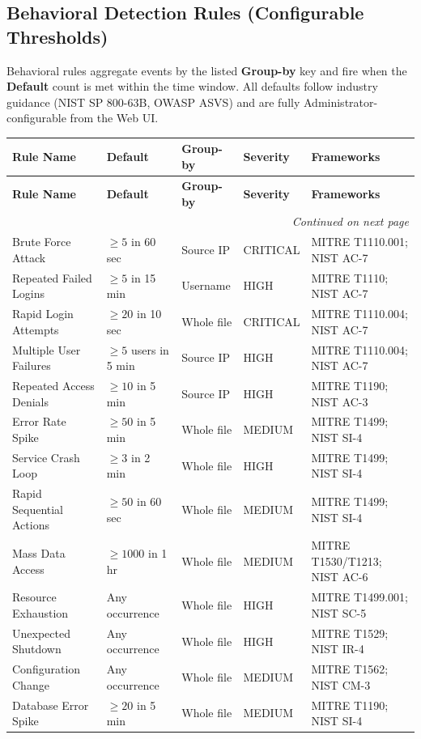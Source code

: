 \documentclass[12pt,a4paper]{article}
\begin{document}
\subsection{Behavioral Detection Rules (Configurable Thresholds)}

Behavioral rules aggregate events by the listed \textbf{Group-by} key and fire when the
\textbf{Default} count is met within the time window. All defaults follow industry guidance
(NIST SP 800-63B, OWASP ASVS) and are fully Administrator-configurable from the Web UI.

\begin{longtable}{|p{3.7cm}|p{3.0cm}|p{2.1cm}|p{1.9cm}|p{3.0cm}|}
\hline
\textbf{Rule Name} & \textbf{Default} & \textbf{Group-by} & \textbf{Severity} & \textbf{Frameworks} \\
\hline
\endfirsthead
\hline
\textbf{Rule Name} & \textbf{Default} & \textbf{Group-by} & \textbf{Severity} & \textbf{Frameworks} \\
\hline
\endhead
\hline
\multicolumn{5}{|r|}{\textit{Continued on next page}} \\
\hline
\endfoot
\hline
\endlastfoot
Brute Force Attack & $\geq 5$ in 60 sec & Source IP & CRITICAL & MITRE T1110.001; NIST AC-7 \\
\hline
Repeated Failed Logins & $\geq 5$ in 15 min & Username & HIGH & MITRE T1110; NIST AC-7 \\
\hline
Rapid Login Attempts & $\geq 20$ in 10 sec & Whole file & CRITICAL & MITRE T1110.004; NIST AC-7 \\
\hline
Multiple User Failures & $\geq 5$ users in 5 min & Source IP & HIGH & MITRE T1110.004; NIST AC-7 \\
\hline
Repeated Access Denials & $\geq 10$ in 5 min & Source IP & HIGH & MITRE T1190; NIST AC-3 \\
\hline
Error Rate Spike & $\geq 50$ in 5 min & Whole file & MEDIUM & MITRE T1499; NIST SI-4 \\
\hline
Service Crash Loop & $\geq 3$ in 2 min & Whole file & HIGH & MITRE T1499; NIST SI-4 \\
\hline
Rapid Sequential Actions & $\geq 50$ in 60 sec & Whole file & MEDIUM & MITRE T1499; NIST SI-4 \\
\hline
Mass Data Access & $\geq 1000$ in 1 hr & Whole file & MEDIUM & MITRE T1530/T1213; NIST AC-6 \\
\hline
Resource Exhaustion & Any occurrence & Whole file & HIGH & MITRE T1499.001; NIST SC-5 \\
\hline
Unexpected Shutdown & Any occurrence & Whole file & HIGH & MITRE T1529; NIST IR-4 \\
\hline
Configuration Change & Any occurrence & Whole file & MEDIUM & MITRE T1562; NIST CM-3 \\
\hline
Database Error Spike & $\geq 20$ in 5 min & Whole file & MEDIUM & MITRE T1190; NIST SI-4 \\
\hline
\end{longtable}
\end{document}
